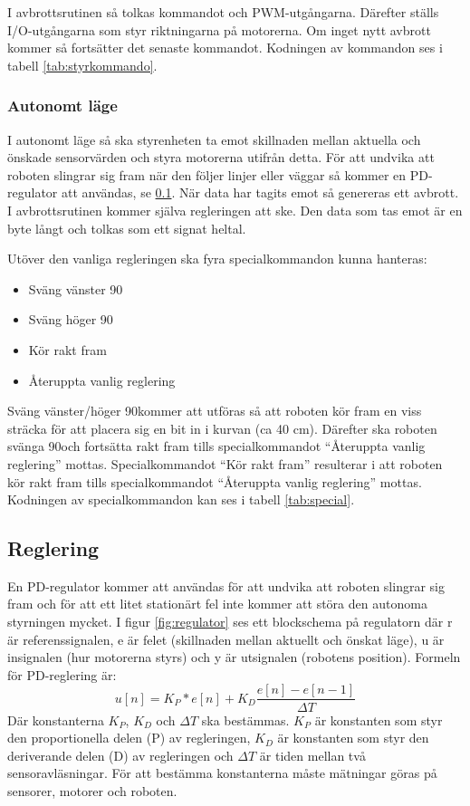 I avbrottsrutinen så tolkas kommandot och PWM-utgångarna. Därefter ställs I/O-utgångarna som styr riktningarna på motorerna. Om inget nytt avbrott kommer så fortsätter det senaste kommandot.
Kodningen av kommandon ses i tabell \ref{tab:styrkommando}.


\subsubsection{Autonomt läge}
I autonomt läge så ska styrenheten ta emot skillnaden mellan aktuella och önskade sensorvärden och styra motorerna utifrån detta.
För att undvika att roboten slingrar sig fram när den följer linjer eller 
väggar så kommer en PD-regulator att användas, se \ref{reglering}.
När data har tagits emot så genereras ett avbrott. 
I avbrottsrutinen kommer själva regleringen att ske. Den data som tas emot är en byte långt 
och tolkas som ett signat heltal. 

Utöver den vanliga regleringen ska fyra specialkommandon kunna hanteras:
\begin{itemize}
  \item{Sväng vänster 90\degree}
  \item{Sväng höger 90\degree}
  \item{Kör rakt fram}
  \item{Återuppta vanlig reglering}
\end{itemize}

Sväng vänster/höger 90\degree  kommer att utföras så att roboten kör fram en viss sträcka för att placera sig en bit in i kurvan (ca 40 cm). Därefter ska roboten svänga 90\degree  och fortsätta rakt fram tills specialkommandot ``Återuppta vanlig reglering'' mottas.
Specialkommandot ``Kör rakt fram'' resulterar i att roboten kör rakt fram tills specialkommandot ``Återuppta vanlig reglering'' mottas.
Kodningen av specialkommandon kan ses i tabell \ref{tab:special}.

\subsection{Reglering}
\label{reglering}
En PD-regulator kommer att användas för att undvika att roboten slingrar sig fram och för att ett litet stationärt fel inte kommer att störa
den autonoma styrningen mycket. I figur \ref{fig:regulator} ses ett blockschema på regulatorn där r är referenssignalen,
e är felet (skillnaden mellan aktuellt och önskat läge), u är insignalen (hur motorerna styrs) och y är utsignalen (robotens position).
Formeln för PD-reglering är: $$ u[n] = K_P*e[n] + K_D\frac{e[n]-e[n-1]}{\Delta T}$$
Där konstanterna $K_P$, $K_D$ och $\Delta T$ ska bestämmas. $K_P$ är konstanten som styr den proportionella delen (P) av regleringen, 
$K_D$ är konstanten som styr den deriverande delen (D) av regleringen och $\Delta T$ är tiden mellan två sensoravläsningar. 
För att bestämma konstanterna måste mätningar göras på sensorer, motorer och roboten.

